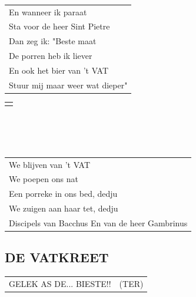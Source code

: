 \documentclass[a4paper, 14pt]{extarticle}
\begin{document}
\\\\\\
\begin{tabularx}{\textwidth}{>{\raggedright\arraybackslash}X}
En wanneer ik paraat\\
Sta voor de heer Sint Pietre\\
Dan zeg ik: "Beste maat\\
De porren heb ik liever\\
En ook het bier van ’t VAT\\
Stuur mij maar weer wat dieper" \\
\end{tabularx}
\newpage
\begin{tabularx}{\textwidth}{>{\raggedright\arraybackslash}X}
    {\small (Laatste refrein:)}\\
\end{tabularx}
\\\\\\
\begin{tabularx}{\textwidth}{>{\raggedright\arraybackslash}X}
We blijven van ’t VAT\\
We poepen ons nat\\
Een porreke in ons bed, dedju\\
We zuigen aan haar tet, dedju\\
Discipels van Bacchus En van de heer Gambrinus    \\
\end{tabularx}
\subsection*{DE VATKREET}
\begin{tabularx}{\textwidth}{>{\raggedright\arraybackslash}X c}
    GELEK AS DE... BIESTE!! & (TER)
\end{tabularx}
\end{document}
